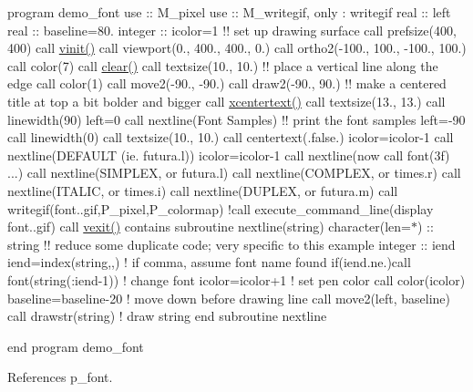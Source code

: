 program demo\+\_\+font use \+:\+: M\+\_\+pixel use \+:\+: M\+\_\+writegif, only \+: writegif real \+:\+: left real \+:\+: baseline=80. integer \+:\+: icolor=1 !! set up drawing surface call prefsize(400, 400) call \hyperlink{namespacem__pixel_ac03ca8f23fdadb60599b6ea4dc87a6d9}{vinit()} call viewport(0., 400., 400., 0.) call ortho2(-\/100., 100., -\/100., 100.) call color(7) call \hyperlink{namespacem__pixel_af3b81a21a0b2f6b5eddd09c031bd6173}{clear()} call textsize(10., 10.) !! place a vertical line along the edge call color(1) call move2(-\/90., -\/90.) call draw2(-\/90., 90.) !! make a centered title at top a bit bolder and bigger call \hyperlink{namespacem__pixel_a1e0c43d36b35eafea921f91c31d8a478}{xcentertext()} call textsize(13., 13.) call linewidth(90) left=0 call nextline(\textquotesingle{}Font Samples\textquotesingle{}) !! print the font samples left=-\/90 call linewidth(0) call textsize(10., 10.) call centertext(.false.) icolor=icolor-\/1 call nextline(\textquotesingle{}D\+E\+F\+A\+U\+LT (ie. futura.\+l)\textquotesingle{}) icolor=icolor-\/1 call nextline(\textquotesingle{}now call font(3f) ...\textquotesingle{}) call nextline(\textquotesingle{}S\+I\+M\+P\+L\+EX, or futura.\+l\textquotesingle{}) call nextline(\textquotesingle{}C\+O\+M\+P\+L\+EX, or times.\+r\textquotesingle{}) call nextline(\textquotesingle{}I\+T\+A\+L\+IC, or times.\+i\textquotesingle{}) call nextline(\textquotesingle{}D\+U\+P\+L\+EX, or futura.\+m\textquotesingle{}) call writegif(\textquotesingle{}font..\+gif\textquotesingle{},P\+\_\+pixel,P\+\_\+colormap) !call execute\+\_\+command\+\_\+line(\textquotesingle{}display font..\+gif\textquotesingle{}) call \hyperlink{namespacem__pixel_a19ad6b65752322b0029a62cc0ebec3e8}{vexit()} contains subroutine nextline(string) character(len=$\ast$) \+:\+: string !! reduce some duplicate code; very specific to this example integer \+:\+: iend iend=index(string,\textquotesingle{},\textquotesingle{}) ! if comma, assume font name found if(iend.\+ne.)call font(string(\+:iend-\/1)) ! change font icolor=icolor+1 ! set pen color call color(icolor) baseline=baseline-\/20 ! move down before drawing line call move2(left, baseline) call drawstr(string) ! draw string end subroutine nextline

end program demo\+\_\+font 

References p\+\_\+font.

